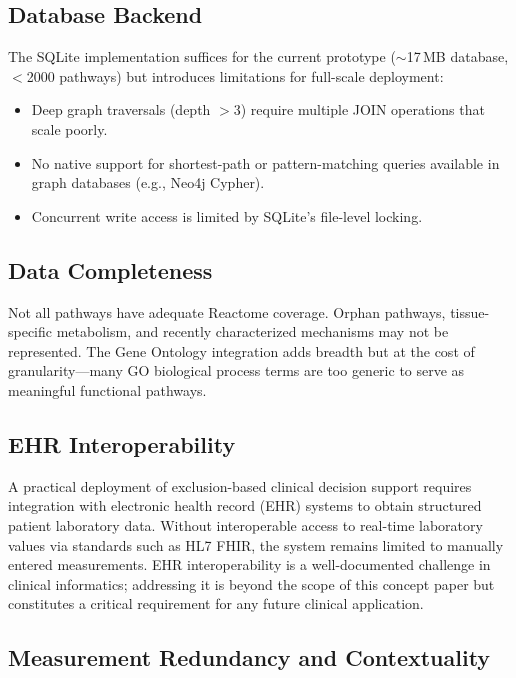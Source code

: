 \documentclass[12pt,a4paper]{article}
\begin{document}
\subsection{Database Backend}

The SQLite implementation suffices for the current prototype ($\sim$17\,MB database, $<$2000 pathways) but introduces limitations for full-scale deployment:

\begin{itemize}
    \item Deep graph traversals (depth $>3$) require multiple JOIN operations that scale poorly.
    \item No native support for shortest-path or pattern-matching queries available in graph databases (e.g., Neo4j Cypher).
    \item Concurrent write access is limited by SQLite's file-level locking.
\end{itemize}

\subsection{Data Completeness}

Not all pathways have adequate Reactome coverage. Orphan pathways, tissue-specific metabolism, and recently characterized mechanisms may not be represented. The Gene Ontology integration adds breadth but at the cost of granularity---many GO biological process terms are too generic to serve as meaningful functional pathways.

\subsection{EHR Interoperability}

A practical deployment of exclusion-based clinical decision support requires integration with electronic health record (EHR) systems to obtain structured patient laboratory data. Without interoperable access to real-time laboratory values via standards such as HL7 FHIR, the system remains limited to manually entered measurements. EHR interoperability is a well-documented challenge in clinical informatics; addressing it is beyond the scope of this concept paper but constitutes a critical requirement for any future clinical application.

\subsection{Measurement Redundancy and Contextuality}
\end{document}
